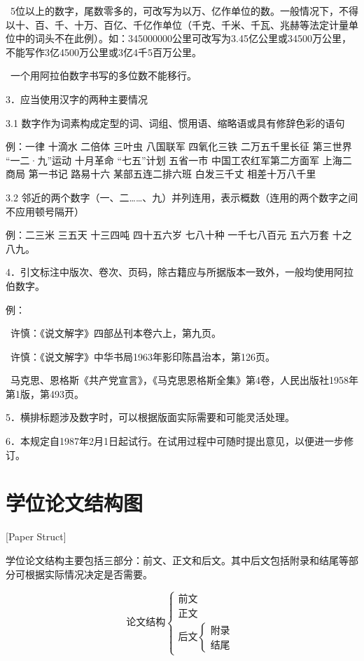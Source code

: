 ~5位以上的数字，尾数零多的，可改写为以万、亿作单位的数。一般情况下，不得以十、百、千、十万、百亿、千亿作单位（千克、千米、千瓦、兆赫等法定计量单位中的词头不在此例）。如：345000000公里可改写为3.45亿公里或34500万公里，不能写作3亿4500万公里或3亿4千5百万公里。

~一个用阿拉伯数字书写的多位数不能移行。

3．应当使用汉字的两种主要情况

3.1  数字作为词素构成定型的词、词组、惯用语、缩略语或具有修辞色彩的语句

例：一律  十滴水  二倍体  三叶虫  八国联军  四氧化三铁  二万五千里长征  第三世界  “一二·九”运动  十月革命  “七五”计划  五省一市  中国工农红军第二方面军  上海二商局 第一书记  路易十六  某部五连二排六班  白发三千丈  相差十万八千里

3.2  邻近的两个数字（一、二……、九）并列连用，表示概数（连用的两个数字之间不应用顿号隔开）

例：二三米  三五天  十三四吨  四十五六岁  七八十种  一千七八百元  五六万套  十之八九。

4．引文标注中版次、卷次、页码，除古籍应与所据版本一致外，一般均使用阿拉伯数字。

例：

~许慎：《说文解字》四部丛刊本卷六上，第九页。

~许慎：《说文解字》中华书局1963年影印陈昌治本，第126页。

~马克思、恩格斯《共产党宣言》，《马克思恩格斯全集》第4卷，人民出版社1958年第1版，第493页。

5．横排标题涉及数字时，可以根据版面实际需要和可能灵活处理。

6．本规定自1987年2月1日起试行。在试用过程中可随时提出意见，以便进一步修订。

\chapter{学位论文结构图}[Paper Struct]

学位论文结构主要包括三部分：前文、正文和后文。其中后文包括附录和结尾等部分可根据实际情况决定是否需要。

\[
    \text{论文结构}
    \begin{cases}
        \text{前文} \\
        \text{正文} \\
        \text{后文} 
        \begin{cases}
        \text{附录} \\
        \text{结尾}
        \end{cases}
    \end{cases}
\]


